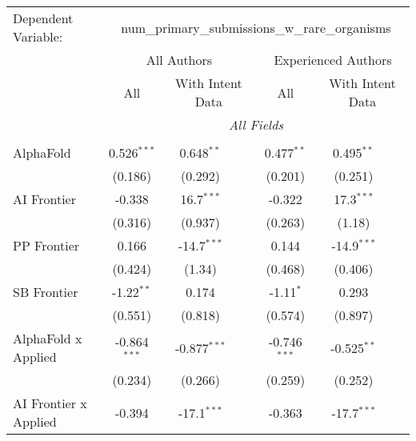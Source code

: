 \begingroup
\centering
\begin{tabular}{lcccccc}
   \tabularnewline \midrule \midrule
   Dependent Variable: & \multicolumn{6}{c}{num\_primary\_submissions\_w\_rare\_organisms}\\
 & \multicolumn{3}{c}{All Authors} & \multicolumn{3}{c}{Experienced Authors} \\
\cmidrule(lr){2-4} \cmidrule(lr){5-7}
 & \multicolumn{1}{c}{All} & \multicolumn{2}{c}{With Intent Data} & \multicolumn{1}{c}{All} & \multicolumn{2}{c}{With Intent Data} \\
\cmidrule(lr){2-2} \cmidrule(lr){3-4} \cmidrule(lr){5-5} \cmidrule(lr){6-7}
 & \multicolumn{6}{c}{\textit{All Fields}} \\ \\
   AlphaFold                      & 0.526$^{***}$  & 0.648$^{**}$   &               & 0.477$^{**}$   & 0.495$^{**}$  &   \\   
                                  & (0.186)        & (0.292)        &               & (0.201)        & (0.251)       &   \\   
   AI Frontier                    & -0.338         & 16.7$^{***}$   &               & -0.322         & 17.3$^{***}$  &   \\   
                                  & (0.316)        & (0.937)        &               & (0.263)        & (1.18)        &   \\   
   PP Frontier                    & 0.166          & -14.7$^{***}$  &               & 0.144          & -14.9$^{***}$ &   \\   
                                  & (0.424)        & (1.34)         &               & (0.468)        & (0.406)       &   \\   
   SB Frontier                    & -1.22$^{**}$   & 0.174          &               & -1.11$^{*}$    & 0.293         &   \\   
                                  & (0.551)        & (0.818)        &               & (0.574)        & (0.897)       &   \\   
   AlphaFold x Applied            & -0.864$^{***}$ & -0.877$^{***}$ &               & -0.746$^{***}$ & -0.525$^{**}$ &   \\   
                                  & (0.234)        & (0.266)        &               & (0.259)        & (0.252)       &   \\   
   AI Frontier x Applied          & -0.394         & -17.1$^{***}$  &               & -0.363         & -17.7$^{***}$ &   \\   

\end{tabular}
